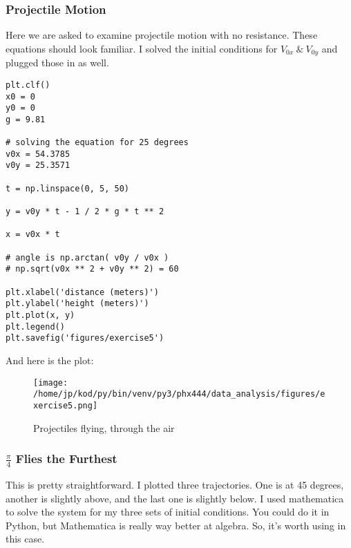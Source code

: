 \documentclass{article}
\begin{document}
\subsubsection{Projectile Motion}

Here we are asked to examine projectile motion with no resistance. These
equations should look familiar. I solved the initial conditions for $V_{0x}
~\& ~ V_{0y}$ and plugged those in as well.

\begin{center}
\begin{minipage}[t]{.75\textwidth}
\begin{lstlisting}[frame=tlrb]
plt.clf()
x0 = 0
y0 = 0
g = 9.81

# solving the equation for 25 degrees
v0x = 54.3785
v0y = 25.3571

t = np.linspace(0, 5, 50)

y = v0y * t - 1 / 2 * g * t ** 2

x = v0x * t 

# angle is np.arctan( v0y / v0x )
# np.sqrt(v0x ** 2 + v0y ** 2) = 60

plt.xlabel('distance (meters)')
plt.ylabel('height (meters)')
plt.plot(x, y)
plt.legend()
plt.savefig('figures/exercise5')

\end{lstlisting}
\end{minipage}
\end{center}

And here is the plot:


\begin{figure}[H]
        \begin{center}
        \texttt{[image: /home/jp/kod/py/bin/venv/py3/phx444/data\_analysis/figures/exercise5.png]}
        \caption{Projectiles flying, through the air}
        \label{fig:fig_8}
        \end{center}
\end{figure}

\subsubsection{$\frac{\pi}{4}$ Flies the Furthest}
This is pretty straightforward. I plotted three trajectories. One is at 45
degrees, another is slightly above, and the last one is slightly below. I used
mathematica to solve the system for my three sets of initial conditions. You
could do it in Python, but Mathematica is really way better at algebra. So,
it's worth using in this case.
\end{document}

